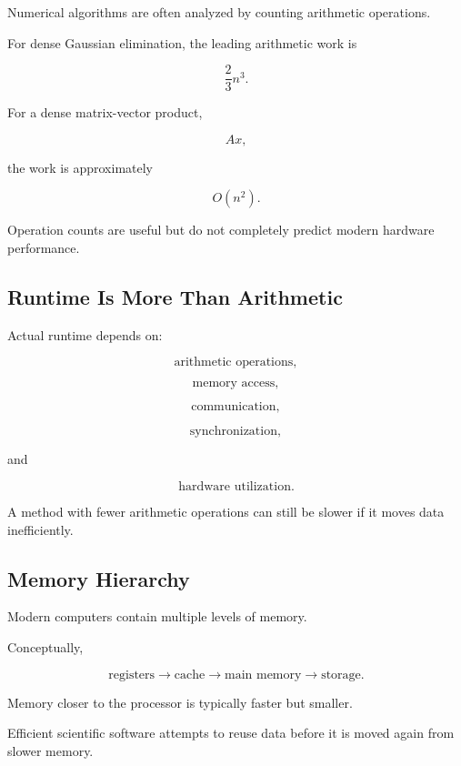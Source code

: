 Numerical algorithms are often analyzed by counting arithmetic operations.

For dense Gaussian elimination, the leading arithmetic work is

\[
\boxed{
\frac{2}{3}n^3.
}
\]

For a dense matrix-vector product,

\[
\boxed{
A x,
}
\]

the work is approximately

\[
\boxed{
O(n^2).
}
\]

Operation counts are useful but do not completely predict modern hardware
performance.

\subsection{Runtime Is More Than Arithmetic}
\label{subsec:runtime-more-than-arithmetic}

Actual runtime depends on:

\[
\boxed{
\text{arithmetic operations},
}
\]

\[
\boxed{
\text{memory access},
}
\]

\[
\boxed{
\text{communication},
}
\]

\[
\boxed{
\text{synchronization},
}
\]

and

\[
\boxed{
\text{hardware utilization}.
}
\]

A method with fewer arithmetic operations can still be slower if it moves
data inefficiently.

\subsection{Memory Hierarchy}
\label{subsec:memory-hierarchy}

Modern computers contain multiple levels of memory.

Conceptually,

\[
\boxed{
\text{registers}
\rightarrow
\text{cache}
\rightarrow
\text{main memory}
\rightarrow
\text{storage}.
}
\]

Memory closer to the processor is typically faster but smaller.

Efficient scientific software attempts to reuse data before it is moved
again from slower memory.

